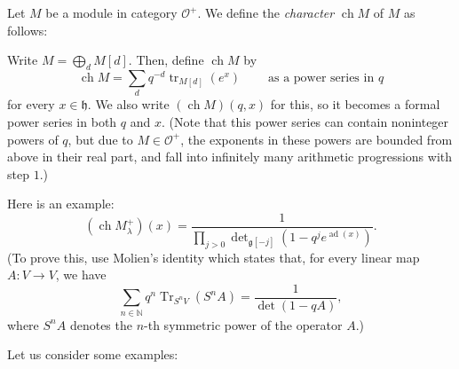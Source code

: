 \documentclass[etingof-lie.tex]{subfiles}
\begin{document}
\begin{definition}
Let $M$ be a module in category $\mathcal{O}^{+}$. We define the
\textit{character} $\operatorname*{ch}M$ of $M$ as follows:

Write $M=\bigoplus\limits_{d}M\left[  d\right]  $. Then, define
$\operatorname*{ch}M$ by%
\[
\operatorname*{ch}M=\sum\limits_{d}q^{-d}\operatorname*{tr}\nolimits_{M\left[
d\right]  }\left(  e^{x}\right)  \ \ \ \ \ \ \ \ \ \ \text{as a power series
in }q
\]
for every $x\in\mathfrak{h}$. We also write $\left(  \operatorname*{ch}%
M\right)  \left(  q,x\right)  $ for this, so it becomes a formal power series
in both $q$ and $x$. (Note that this power series can contain noninteger
powers of $q$, but due to $M\in\mathcal{O}^{+}$, the exponents in these powers
are bounded from above in their real part, and fall into infinitely many
arithmetic progressions with step $1$.)
\end{definition}

\begin{proposition}
\label{prop.chVerma}Here is an example:%
\[
\left(  \operatorname*{ch}M_{\lambda}^{+}\right)  \left(  x\right)  =\dfrac
{1}{\prod\limits_{j>0}\det\nolimits_{\mathfrak{g}\left[  -j\right]  }\left(
1-q^{j}e^{\operatorname*{ad}\left(  x\right)  }\right)  }.
\]
(To prove this, use Molien's identity which states that, for every linear map
$A:V\rightarrow V$, we have%
\[
\sum\limits_{n\in\mathbb{N}}q^{n}\operatorname*{Tr}\nolimits_{S^{n}V}\left(
S^{n}A\right)  =\dfrac{1}{\det\left(  1-qA\right)  },
\]
where $S^{n}A$ denotes the $n$-th symmetric power of the operator $A$.)
\end{proposition}

Let us consider some examples:
\end{document}

